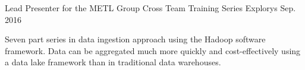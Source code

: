 \begin{cvpublications}
{\begin{cvparagraph}
      \end{cvparagraph}
    }
  \cvpublication
    {Lead Presenter for the METL Group} %
    {Cross Team Training Series} %
    {Explorys} %
    {Sep. 2016} %
    {
      \begin{cvparagraph}
        Seven part series in data ingestion approach using the Hadoop software framework.  Data can be aggregated much more quickly and cost-effectively using a data lake framework than in traditional data warehouses.
      \end{cvparagraph}
    }
\end{cvpublications}
